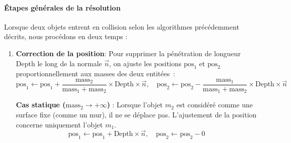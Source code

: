 \documentclass[a4paper,11pt]{article}
\begin{document}
\paragraph{Étapes générales de la résolution}
Lorsque deux objets entrent en collision selon les algorithmes précédemment décrits, nous procédons en deux temps :
\begin{enumerate}
    \item \textbf{Correction de la position}: Pour supprimer la pénétration de longueur \(\text{Depth}\) le long de la normale \(\vec{n}\), on ajuste les positions \(\text{pos}_1\) et \(\text{pos}_2\) proportionnellement aux masses des deux entitées~:
    \[
    \text{pos}_1 \gets \text{pos}_1 + \frac{\text{mass}_2}{\text{mass}_1 + \text{mass}_2} \times \text{Depth} \times\vec{n}, \quad
    \text{pos}_2 \gets \text{pos}_2 - \frac{\text{mass}_1}{\text{mass}_1 + \text{mass}_2} \times \text{Depth} \times \vec{n}
    \]

    \textbf{Cas statique (\(\text{mass}_2 \to +\infty\))} : 
    Lorsque l'objet \(m_2\) est considéré comme une surface fixe (comme un mur), il ne se déplace pas. L'ajustement de la position concerne uniquement l'objet \(m_1\).
    \[
    \text{pos}_1 \gets \text{pos}_1 +  \text{Depth} \times \vec{n}, \quad \text{pos}_2 \gets \text{pos}_2 - 0
    \]


\end{enumerate}
\end{document}
